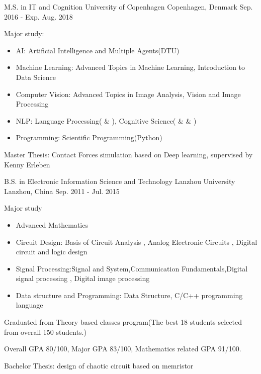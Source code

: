 \begin{cventries}
  \cventry
    {M.S. in IT and Cognition}
    {University of Copenhagen}
    {Copenhagen, Denmark}
    {Sep. 2016 - Exp. Aug. 2018}
    {
      \begin{cvitems}
        \item {
            Major study:
            \begin{itemize}
                \item AI: Artificial Intelligence and Multiple Agents(DTU)
                \item Machine Learning: Advanced Topics in Machine Learning,  Introduction to Data Science
                \item Computer Vision: Advanced Topics in Image Analysis, Vision and Image Processing
                \item NLP: Language Processing(\uppercase\expandafter{} \& \uppercase\expandafter{}), Cognitive Science(\uppercase\expandafter{} \& \uppercase\expandafter{} \& \uppercase\expandafter{})
                \item Programming: Scientific Programming(Python)
            \end{itemize}
        }
        \item {Master Thesis: Contact Forces simulation based on Deep learning, supervised by Kenny Erleben}
      \end{cvitems}
    }
    \cventry
    {B.S. in Electronic Information Science and Technology}
    {Lanzhou University}
    {Lanzhou, China}
    {Sep. 2011 - Jul. 2015}
    {
      \begin{cvitems}
        \item {
            Major study
            \begin{itemize}
                \item Advanced Mathematics
                \item Circuit Design: Basis of Circuit Analysis , Analog Electronic Circuits , Digital
                circuit and logic design
                \item Signal Processing:Signal and System,Communication Fundamentals,Digital
                signal processing , Digital image processing
                \item Data structure and Programming: Data Structure, C/C++ programming language
            \end{itemize}
        }
        \item {Graduated from Theory based classes program(The best 18 students selected from overall 150 students.)}
        \item {Overall GPA 80/100, Major GPA 83/100, Mathematics related GPA 91/100.}
        \item {Bachelor Thesis: design of chaotic circuit based on memristor}
      \end{cvitems}
    }
\end{cventries}
